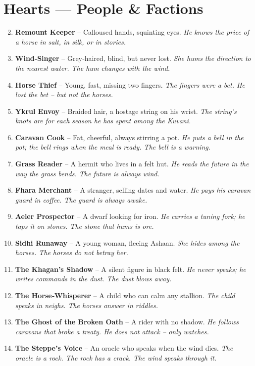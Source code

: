 \documentclass[11pt]{book}
\begin{document}
\section*{Hearts — People \& Factions}
\begin{enumerate}
\setcounter{enumi}{1}
\item \textbf{Remount Keeper} – Calloused hands, squinting eyes. \textit{He knows the price of a horse in salt, in silk, or in stories.}
\item \textbf{Wind‑Singer} – Grey‑haired, blind, but never lost. \textit{She hums the direction to the nearest water. The hum changes with the wind.}
\item \textbf{Horse Thief} – Young, fast, missing two fingers. \textit{The fingers were a bet. He lost the bet – but not the horses.}
\item \textbf{Ykrul Envoy} – Braided hair, a hostage string on his wrist. \textit{The string’s knots are for each season he has spent among the Kuvani.}
\item \textbf{Caravan Cook} – Fat, cheerful, always stirring a pot. \textit{He puts a bell in the pot; the bell rings when the meal is ready. The bell is a warning.}
\item \textbf{Grass Reader} – A hermit who lives in a felt hut. \textit{He reads the future in the way the grass bends. The future is always wind.}
\item \textbf{Fhara Merchant} – A stranger, selling dates and water. \textit{He pays his caravan guard in coffee. The guard is always awake.}
\item \textbf{Aeler Prospector} – A dwarf looking for iron. \textit{He carries a tuning fork; he taps it on stones. The stone that hums is ore.}
\item \textbf{Sidhi Runaway} – A young woman, fleeing Ashaan. \textit{She hides among the horses. The horses do not betray her.}
\item[J] \textbf{The Khagan’s Shadow} – A silent figure in black felt. \textit{He never speaks; he writes commands in the dust. The dust blows away.}
\item[Q] \textbf{The Horse‑Whisperer} – A child who can calm any stallion. \textit{The child speaks in neighs. The horses answer in riddles.}
\item[K] \textbf{The Ghost of the Broken Oath} – A rider with no shadow. \textit{He follows caravans that broke a treaty. He does not attack – only watches.}
\item[A] \textbf{The Steppe’s Voice} – An oracle who speaks when the wind dies. \textit{The oracle is a rock. The rock has a crack. The wind speaks through it.}
\end{enumerate}
\end{document}
